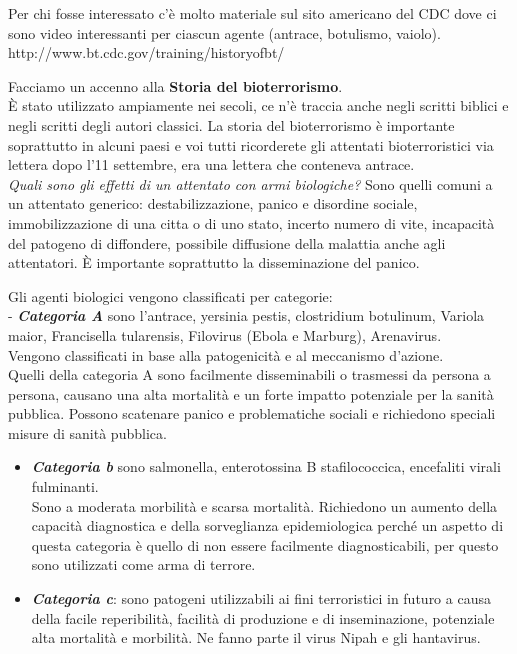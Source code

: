 Per chi fosse interessato c'è molto materiale sul sito americano del CDC
dove ci sono video interessanti per ciascun agente (antrace, botulismo,
vaiolo). http://www.bt.cdc.gov/training/historyofbt/

Facciamo un accenno alla \textbf{Storia del bioterrorismo}.\\
È stato utilizzato ampiamente nei secoli, ce n'è traccia anche negli
scritti biblici e negli scritti degli autori classici. La storia del
bioterrorismo è importante soprattutto in alcuni paesi e voi tutti
ricorderete gli attentati bioterroristici via lettera dopo l'11
settembre, era una lettera che conteneva antrace.\\
\emph{Quali sono gli effetti di un attentato con armi biologiche?} Sono
quelli comuni a un attentato generico: destabilizzazione, panico e
disordine sociale, immobilizzazione di una citta o di uno stato, incerto
numero di vite, incapacità del patogeno di diffondere, possibile
diffusione della malattia anche agli attentatori. È importante
soprattutto la disseminazione del panico.

Gli agenti biologici vengono classificati per categorie:\\
- \textbf{\emph{Categoria A}} sono l'antrace, yersinia pestis,
clostridium botulinum, Variola maior, Francisella tularensis, Filovirus
(Ebola e Marburg), Arenavirus.\\
Vengono classificati in base alla patogenicità e al meccanismo
d'azione.\\
Quelli della categoria A sono facilmente disseminabili o trasmessi da
persona a persona, causano una alta mortalità e un forte impatto
potenziale per la sanità pubblica. Possono scatenare panico e
problematiche sociali e richiedono speciali misure di sanità pubblica.
\begin{itemize}
\item
\textbf{\emph{Categoria b}} sono salmonella, enterotossina B
stafilococcica, encefaliti virali fulminanti.\\
Sono a moderata morbilità e scarsa mortalità. Richiedono un aumento
della capacità diagnostica e della sorveglianza epidemiologica perché un
aspetto di questa categoria è quello di non essere facilmente
diagnosticabili, per questo sono utilizzati come arma di terrore.
\item
 \textbf{\emph{Categoria c}}: sono patogeni utilizzabili ai fini
terroristici in futuro a causa della facile reperibilità, facilità di
produzione e di inseminazione, potenziale alta mortalità e morbilità. Ne
fanno parte il virus Nipah e gli hantavirus.
\end{itemize}

